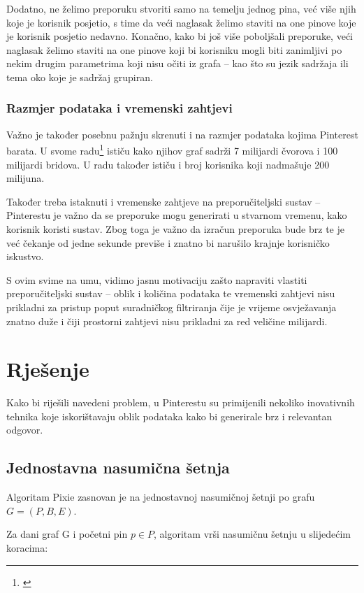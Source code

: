 \documentclass[times, utf8, seminar]{fer}
\begin{document}
Dodatno, ne želimo preporuku stvoriti samo na temelju jednog pina, već više njih koje je korisnik posjetio, s time da veći naglasak želimo staviti na one pinove koje je korisnik posjetio nedavno. Konačno, kako bi još više poboljšali preporuke, veći naglasak želimo staviti na one pinove koji bi korisniku mogli biti zanimljivi po nekim drugim parametrima koji nisu očiti iz grafa -- kao što su jezik sadržaja ili tema oko koje je sadržaj grupiran.

\subsection{Razmjer podataka i vremenski zahtjevi}

Važno je također posebnu pažnju skrenuti i na razmjer podataka kojima Pinterest barata. U svome radu\footnote{\cite{DBLP:journals/corr/abs-1711-07601}} ističu kako njihov graf sadrži 7 milijardi čvorova i 100 milijardi bridova. U radu također ističu i broj korisnika koji nadmašuje 200 milijuna.

Također treba istaknuti i vremenske zahtjeve na preporučiteljski sustav -- Pinterestu je važno da se preporuke mogu generirati u stvarnom vremenu, kako korisnik koristi sustav. Zbog toga je važno da izračun preporuka bude brz te je već čekanje od jedne sekunde previše i znatno bi narušilo krajnje korisničko iskustvo.

S ovim svime na umu, vidimo jasnu motivaciju zašto napraviti vlastiti preporučiteljski sustav -- oblik i količina podataka te vremenski zahtjevi nisu prikladni za pristup poput suradničkog filtriranja čije je vrijeme osvježavanja znatno duže i čiji prostorni zahtjevi nisu prikladni za red veličine milijardi.

\chapter{Rješenje}

Kako bi riješili navedeni problem, u Pinterestu su primijenili nekoliko inovativnih tehnika koje iskorištavaju oblik podataka kako bi generirale brz i relevantan odgovor.

\section{Jednostavna nasumična šetnja}

Algoritam Pixie zasnovan je na jednostavnoj nasumičnoj šetnji po grafu $G = (P, B, E) $.

Za dani graf G i početni pin $p \in P$, algoritam vrši nasumičnu šetnju u slijedećim koracima:
\end{document}
